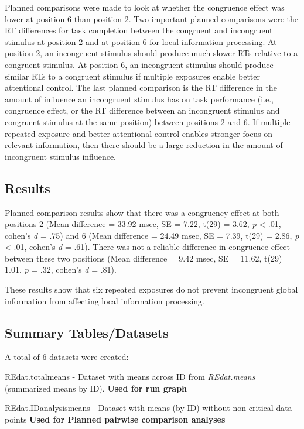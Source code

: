 \documentclass[
]{article}
\begin{document}
Planned comparisons were made to look at whether the congruence effect
was lower at position 6 than position 2. Two important planned
comparisons were the RT differences for task completion between the
congruent and incongruent stimulus at position 2 and at position 6 for
local information processing. At position 2, an incongruent stimulus
should produce much slower RTs relative to a congruent stimulus. At
position 6, an incongruent stimulus should produce similar RTs to a
congruent stimulus if multiple exposures enable better attentional
control. The last planned comparison is the RT difference in the amount
of influence an incongruent stimulus has on task performance (i.e.,
congruence effect, or the RT difference between an incongruent stimulus
and congruent stimulus at the same position) between positions 2 and 6.
If multiple repeated exposure and better attentional control enables
stronger focus on relevant information, then there should be a large
reduction in the amount of incongruent stimulus influence.

\hypertarget{results}{%
\subsection{Results}\label{results}}

Planned comparison results show that there was a congruency effect at
both positions 2 (Mean difference = 33.92 msec, SE = 7.22, t(29) = 3.62,
\emph{p} \textless{} .01, cohen's \emph{d} = .75) and 6 (Mean difference
= 24.49 msec, SE = 7.39, t(29) = 2.86, \emph{p} \textless{} .01, cohen's
\emph{d} = .61). There was not a reliable difference in congruence
effect between these two positions (Mean difference = 9.42 msec, SE =
11.62, t(29) = 1.01, \emph{p} = .32, cohen's \emph{d} = .81).

These results show that six repeated exposures do not prevent
incongruent global information from affecting local information
processing.

\hypertarget{summary-tablesdatasets}{%
\subsection{Summary Tables/Datasets}\label{summary-tablesdatasets}}

A total of 6 datasets were created:

REdat.totalmeans - Dataset with means across ID from \emph{REdat.means}
(summarized means by ID). \textbf{Used for run graph}

REdat.IDanalysismeans - Dataset with means (by ID) without non-critical
data points \textbf{Used for Planned pairwise comparison analyses}
\end{document}
